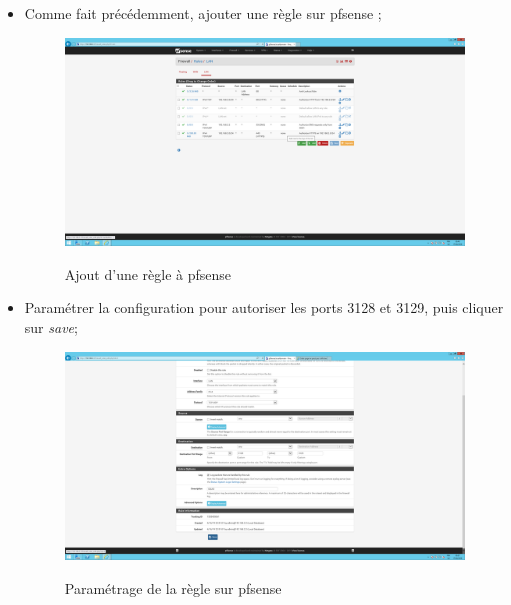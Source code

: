 \begin{itemize}
\item Comme fait précédemment, ajouter une règle sur pfsense ;
\begin{figure}[h!]
    \begin{center}
        \includegraphics[scale=0.20]{Pfsense_Screeshots/interception/17.png}
        \label{Pfsense_Screeshots/interception/17}
        \caption{Ajout d'une règle à pfsense}
    \end{center}
\end{figure}
\FloatBarrier 
    
\item Paramétrer la configuration pour autoriser les ports 3128 et 3129, puis cliquer sur \textit{save};
\begin{figure}[h!]
    \begin{center}
        \includegraphics[scale=0.20]{Pfsense_Screeshots/interception/18.png}
        \label{Pfsense_Screeshots/interception/18}
        \caption{Paramétrage de la règle sur pfsense}
    \end{center}
\end{figure}
\FloatBarrier 


\end{itemize}
